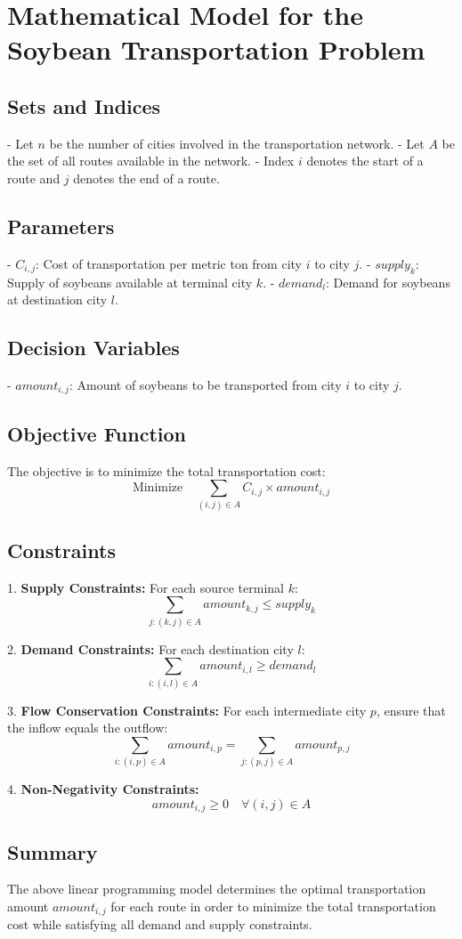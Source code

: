 \documentclass{article}
\begin{document}
\section*{Mathematical Model for the Soybean Transportation Problem}

\subsection*{Sets and Indices}
- Let \( n \) be the number of cities involved in the transportation network.
- Let \( A \) be the set of all routes available in the network.
- Index \( i \) denotes the start of a route and \( j \) denotes the end of a route.

\subsection*{Parameters}
- \( C_{i,j} \): Cost of transportation per metric ton from city \( i \) to city \( j \).
- \( supply_k \): Supply of soybeans available at terminal city \( k \).
- \( demand_l \): Demand for soybeans at destination city \( l \).

\subsection*{Decision Variables}
- \( amount_{i,j} \): Amount of soybeans to be transported from city \( i \) to city \( j \).

\subsection*{Objective Function}
The objective is to minimize the total transportation cost:
\[
\text{Minimize} \quad \sum_{(i,j) \in A} C_{i,j} \times amount_{i,j}
\]

\subsection*{Constraints}
1. \textbf{Supply Constraints:} 
   For each source terminal \( k \):
   \[
   \sum_{j: (k,j) \in A} amount_{k,j} \leq supply_k
   \]

2. \textbf{Demand Constraints:} 
   For each destination city \( l \):
   \[
   \sum_{i: (i,l) \in A} amount_{i,l} \geq demand_l
   \]

3. \textbf{Flow Conservation Constraints:} 
   For each intermediate city \( p \), ensure that the inflow equals the outflow:
   \[
   \sum_{i: (i,p) \in A} amount_{i,p} = \sum_{j: (p,j) \in A} amount_{p,j}
   \]

4. \textbf{Non-Negativity Constraints:}
   \[
   amount_{i,j} \geq 0 \quad \forall (i,j) \in A
   \]

\subsection*{Summary}
The above linear programming model determines the optimal transportation amount \( amount_{i,j} \) for each route in order to minimize the total transportation cost while satisfying all demand and supply constraints.
\end{document}
